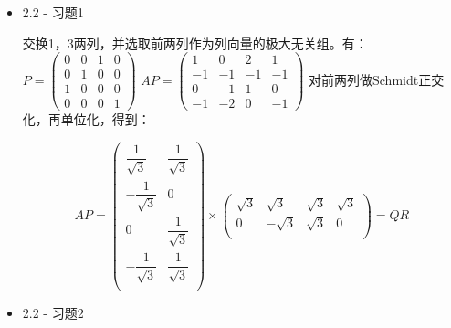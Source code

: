 \documentclass{article}
\begin{document}
\begin{spacing}{1.5}
\begin{itemize}
    \item 2.2 - 习题1
    
    交换1，3两列，并选取前两列作为列向量的极大无关组。有：$P = \left(\begin{array}{cccc}0&0&1&0\\0&1&0&0\\1&0&0&0\\0&0&0&1\end{array}\right)$
    $AP = \left(\begin{array}{cccc}1&0&2&1\\-1&-1&-1&-1\\0&-1&1&0\\-1&-2&0&-1\end{array}\right)$
    对前两列做Schmidt正交化，再单位化，得到：

    $$
    AP = \left(\begin{array}{cc}
        \dfrac{1}{\sqrt 3} & \dfrac{1}{\sqrt 3}\\
        -\dfrac{1}{\sqrt 3} & 0\\
        0 & \dfrac{1}{\sqrt 3}\\
        -\dfrac{1}{\sqrt 3} & \dfrac{1}{\sqrt 3}\\
    \end{array}\right)
    \times 
    \left(\begin{array}{cccc}
        \sqrt{3} & \sqrt{3} & \sqrt{3} & \sqrt{3}\\
        0 & -\sqrt{3} & \sqrt{3} & 0\\
    \end{array}\right)
    = QR
    $$

    \item 2.2 - 习题2
    

\end{itemize}
\end{spacing}
\end{document}

